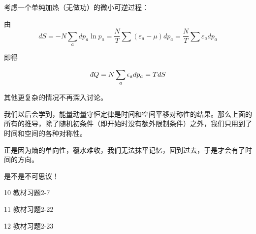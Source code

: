 \documentclass[CJK]{beamer}
\begin{document}
\begin{frame}
\bch
考虑一个单纯加热（无做功）的微小可逆过程：

由
$$dS = -N \sum_a dp_a \ln p_a = \frac{N}{T}\sum (\varepsilon_a-\mu) dp_a = \frac{N}{T}\sum \varepsilon_a  dp_a $$

即得

$$\dbar Q = N\sum_a \epsilon_a d p_a = T dS $$

其他更复杂的情况不再深入讨论。

\ech
\end{frame}

\begin{frame}
\bch
我们以后会学到，能量动量守恒定律是时间和空间平移对称性的结果。那么上面的所有的推导，除了随机初条件（即开始时没有额外限制条件）之外，我们只用到了时间和空间的各种对称性。

\skipline
正是因为熵的单向性，覆水难收，我们无法抹平记忆，回到过去，于是才会有了时间的方向。


是不是不可思议！

\ech
\end{frame}



\begin{frame}
\bch
\bitem
\item[10]{教材习题2-7}
\item[11]{教材习题2-22}
\item[12]{教材习题2-23}
\eitem
\ech
\end{frame}
\end{document}

